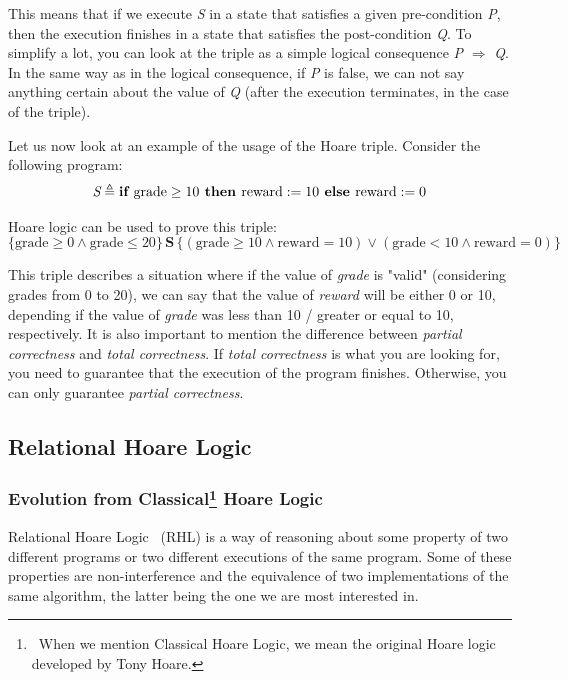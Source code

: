 This means that if we execute \emph{S} in a state that satisfies a given pre-condition \emph{P}, then the execution finishes in a state that satisfies the post-condition \emph{Q}.
To simplify a lot, you can look at the triple as a simple logical consequence \emph{P} $\Rightarrow$ \emph{Q}.
In the same way as in the logical consequence, if \emph{P} is false, we can not say anything certain about the value of \emph{Q} (after the execution terminates, in the case of the triple).

Let us now look at an example of the usage of the Hoare triple. Consider the following program:
\[ 
\emph{S} \triangleq \textbf{if } \text{grade} \geq 10 \textbf{ then } \text{reward} := 10 \textbf{ else } \text{reward} := 0 
\]

Hoare logic can be used to prove this triple:
\[
\{ \text{grade} \geq 0 \land \text{grade} \leq 20 \} \, \textbf{S} \, \{ (\text{grade} \geq 10 \land \text{reward} = 10) \lor (\text{grade} < 10 \land \text{reward} = 0) \}
\]

This triple describes a situation where if the value of \emph{grade} is "valid" (considering grades from 0 to 20), we can say that the value of \emph{reward} will be either 0 or 10, depending if the value of \emph{grade} was less than 10 / greater or equal to 10, respectively.
It is also important to mention the difference between \emph{partial correctness} and \emph{total correctness}.
If \emph{total correctness} is what you are looking for, you need to guarantee that the execution of the program finishes.
Otherwise, you can only guarantee \emph{partial correctness}.


\subsection{Relational Hoare Logic} 
\label{sub:relational_hoare_logic}

\subsubsection{Evolution from Classical\protect\footnote{\ When we mention Classical Hoare Logic, we mean the original Hoare logic developed by Tony Hoare.} Hoare Logic}
\label{sub:relational_hoare_logic_motivation}

Relational Hoare Logic~\cite{naumann2022thirtysevenyearsrelationalhoare, DBLP:conf/popl/Benton04} (RHL) is a way of reasoning about some property of two different programs or two different executions of the same program.
Some of these properties are non-interference and the equivalence of two implementations of the same algorithm, the latter being the one we are most interested in.

